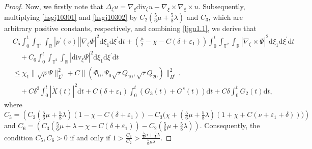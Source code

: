 \documentclass[10pt,reqno]{amsart}
\numberwithin{equation}{section}
\newcommand{\dif}{\mathrm{d}}
\newcommand{\ddiv}{\mathrm{div}}
\begin{document}
\begin{proof}
Now, we firstly note that $\Delta_\xi u=\nabla_\xi\ddiv_{\xi}u-\nabla_{\xi}\times\nabla_{\xi}\times u$. Subsequently, multiplying \eqref{hsgj10301} and \eqref{hsgj10302} by $C_2(\frac{5}{6}\mu+\frac{5}{8}\lambda)$ and $C_3$, which are arbitrary positive constants,  respectively, and combining \eqref{ljgu1.1}, we derive that
\begin{align*}
	&C_5\int_0^t\int_{\mathbb{T}^2}\int_{\mathbb{R}}|p^\prime(v)||\nabla_\xi\Phi|^2\dif \xi_1\dif \xi^{\prime}\dif t+(\frac{\mu}{2}-\chi-C(\delta+\varepsilon_1))\int_0^t\int_{\mathbb{T}^2}\int_{\mathbb{R}}|\nabla_\xi\times\Psi|^2\dif \xi_1\dif \xi^{\prime}\dif t\\
&\quad	+C_6\int_0^t\int_{\mathbb{T}^2}\int_{\mathbb{R}}
	|\ddiv_\xi\Psi|^2
	\dif \xi_1\dif \xi^{\prime}\dif t\\
	&\le 
	\chi_1\|\sqrt\rho\Psi\|_{L^2}^2
	+C\|(\Phi_0, \Psi_0
	\sqrt{\tau}Q_{10}, \sqrt{\tau}Q_{20})\|_{H^1}^2.
	\\
	&\quad+C\delta^2\int_0^t|\dot X(t)|^2\dif t
	+C(\delta
	+\varepsilon_1)\int_0^t\left(G_3(t)+G^s(t)\right)\dif t+C\delta\int_0^t G_2(t)\dif t,
\end{align*}
where $C_5=\left(C_2(\frac{5}{6}\mu+\frac{5}{8}\lambda)(1-\chi-C(\delta+\varepsilon_1))-C_3\Big(\chi+(\frac{5}{6}\mu+\frac{5}{8}\lambda)(1+\chi+C(\nu+\varepsilon_1+\delta))\Big)\right)$ and $C_6=\left(C_3(\frac{5}{6}\mu+\lambda-\chi-C(\delta+\varepsilon_1))-C_2(\frac{5}{6}\mu+\frac{5}{8}\lambda)\right)$. Consequently, the condition $C_5, C_6>0$ if and only if $1>\frac{C_3}{C_2}>\frac{\frac{5}{6}\mu+\frac{5}{8}\lambda}{\frac{5}{6}\mu\lambda}$.


\end{proof}
\end{document}
